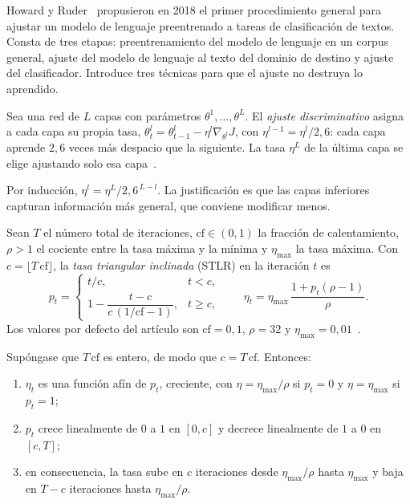Howard y Ruder~\cite{howard-ruder} propusieron en 2018 el primer procedimiento general para ajustar un modelo de lenguaje preentrenado a tareas de clasificación de textos. Consta de tres etapas: preentrenamiento del modelo de lenguaje en un corpus general, ajuste del modelo de lenguaje al texto del dominio de destino y ajuste del clasificador. Introduce tres técnicas para que el ajuste no destruya lo aprendido.

\begin{definicion}\label{def:discriminativas}
Sea una red de $L$ capas con parámetros $\theta^{1},\dots,\theta^{L}$. El \emph{ajuste discriminativo} asigna a cada capa su propia tasa, $\theta^{l}_t=\theta^{l}_{t-1}-\eta^{l}\nabla_{\theta^{l}}J$, con $\eta^{l-1}=\eta^{l}/2{,}6$: cada capa aprende $2{,}6$ veces más despacio que la siguiente. La tasa $\eta^{L}$ de la última capa se elige ajustando solo esa capa~\cite[§3.2]{howard-ruder}.
\end{definicion}

Por inducción, $\eta^{l}=\eta^{L}/2{,}6^{\,L-l}$. La justificación es que las capas inferiores capturan información más general, que conviene modificar menos.

\begin{definicion}\label{def:stlr}
Sean $T$ el número total de iteraciones, $\mathrm{cf}\in(0,1)$ la fracción de calentamiento, $\rho>1$ el cociente entre la tasa máxima y la mínima y $\eta_{\max}$ la tasa máxima. Con $c=\lfloor T\,\mathrm{cf}\rfloor$, la \emph{tasa triangular inclinada} (STLR) en la iteración $t$ es
\[
p_t=\begin{cases} t/c, & t<c,\\[2pt] 1-\dfrac{t-c}{c\,(1/\mathrm{cf}-1)}, & t\ge c,\end{cases}\qquad
\eta_t=\eta_{\max}\,\frac{1+p_t(\rho-1)}{\rho}.
\]
Los valores por defecto del artículo son $\mathrm{cf}=0{,}1$, $\rho=32$ y $\eta_{\max}=0{,}01$~\cite[§3.2]{howard-ruder}.
\end{definicion}

\begin{proposicion}\label{prop:stlr}
Supóngase que $T\,\mathrm{cf}$ es entero, de modo que $c=T\,\mathrm{cf}$. Entonces:
\begin{enumerate}
  \item $\eta_t$ es una función afín de $p_t$, creciente, con $\eta=\eta_{\max}/\rho$ si $p_t=0$ y $\eta=\eta_{\max}$ si $p_t=1$;
  \item $p_t$ crece linealmente de $0$ a $1$ en $[0,c]$ y decrece linealmente de $1$ a $0$ en $[c,T]$;
  \item en consecuencia, la tasa sube en $c$ iteraciones desde $\eta_{\max}/\rho$ hasta $\eta_{\max}$ y baja en $T-c$ iteraciones hasta $\eta_{\max}/\rho$.
\end{enumerate}
\end{proposicion}

